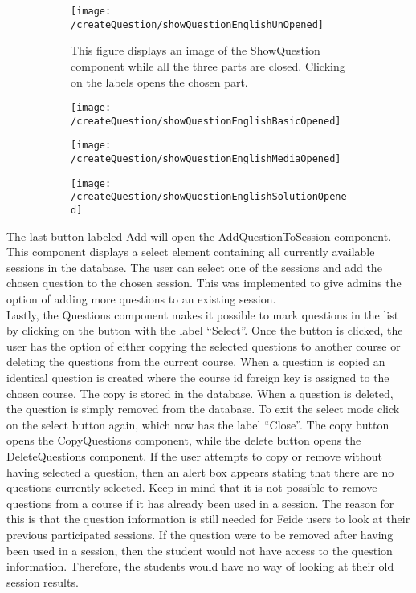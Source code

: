 \begin{figure}[H]
    \centering
    \begin{subfigure}{0.80\linewidth}
        \texttt{[image: /createQuestion/showQuestionEnglishUnOpened]}
        \caption{This figure displays an image of the ShowQuestion component while all the three parts are closed. Clicking on the labels  opens the chosen part.}
        \label{fig:showQuestionUnOpened}
    \end{subfigure}
    \begin{subfigure}{0.32\linewidth}
        \texttt{[image: /createQuestion/showQuestionEnglishBasicOpened]}
        \caption{}
        \label{fig:showQuestionBasicOpened}
    \end{subfigure}
    \begin{subfigure}{0.32\linewidth}
        \texttt{[image: /createQuestion/showQuestionEnglishMediaOpened]}
        \caption{}
        \label{fig:showQuestionMediaOpened}
    \end{subfigure}
    \begin{subfigure}{0.32\linewidth}
        \texttt{[image: /createQuestion/showQuestionEnglishSolutionOpened]}
        \caption{}
        \label{fig:showQuestionSolutionOpened}
    \end{subfigure}
\end{figure}
\noindent
The last button labeled Add will open the AddQuestionToSession component. This component displays a select element containing all currently available sessions in the database. The user can select one of the sessions and add the chosen question to the chosen session. This was implemented to give admins the option of adding more questions to an existing session.
\\[11pt]
Lastly, the Questions component makes it possible to mark questions in the list by clicking on the button with the label “Select”. Once the button is clicked, the user has the option of either copying the selected questions to another course or deleting the questions from the current course. When a question is copied an identical question is created where the course id foreign key is assigned to the chosen course. The copy is stored in the database. When a question is deleted, the question is simply removed from the database. To exit the select mode click on the select button again, which now has the label “Close”. The copy button opens the CopyQuestions component, while the delete button opens the DeleteQuestions component. If the user attempts to copy or remove without having selected a question, then an alert box appears stating that there are no questions currently selected. Keep in mind that it is not possible to remove questions from a course if it has already been used in a session. The reason for this is that the question information is still needed for Feide users to look at their previous participated sessions. If the question were to be removed after having been used in a session, then the student would not have access to the question information. Therefore, the students would have no way of looking at their old session results. 

